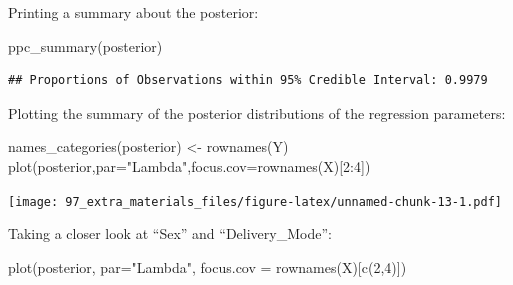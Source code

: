 \documentclass[
]{book}
\newenvironment{Shaded}{\begin{snugshade}}{\end{snugshade}}
\newcommand{\AttributeTok}[1]{\textcolor[rgb]{0.77,0.63,0.00}{#1}}
\newcommand{\CommentTok}[1]{\textcolor[rgb]{0.56,0.35,0.01}{\textit{#1}}}
\newcommand{\DecValTok}[1]{\textcolor[rgb]{0.00,0.00,0.81}{#1}}
\newcommand{\FloatTok}[1]{\textcolor[rgb]{0.00,0.00,0.81}{#1}}
\newcommand{\FunctionTok}[1]{\textcolor[rgb]{0.00,0.00,0.00}{#1}}
\newcommand{\NormalTok}[1]{#1}
\newcommand{\OtherTok}[1]{\textcolor[rgb]{0.56,0.35,0.01}{#1}}
\newcommand{\SpecialCharTok}[1]{\textcolor[rgb]{0.00,0.00,0.00}{#1}}
\newcommand{\StringTok}[1]{\textcolor[rgb]{0.31,0.60,0.02}{#1}}
\begin{document}
\begin{Shaded}
\end{Shaded}

Printing a summary about the posterior:

\begin{Shaded}
\begin{Highlighting}[]
\FunctionTok{ppc\_summary}\NormalTok{(posterior)}
\end{Highlighting}
\end{Shaded}

\begin{verbatim}
## Proportions of Observations within 95% Credible Interval: 0.9979
\end{verbatim}

Plotting the summary of the posterior distributions of the regression parameters:

\begin{Shaded}
\begin{Highlighting}[]
\FunctionTok{names\_categories}\NormalTok{(posterior) }\OtherTok{\textless{}{-}} \FunctionTok{rownames}\NormalTok{(Y)}
\FunctionTok{plot}\NormalTok{(posterior,}\AttributeTok{par=}\StringTok{"Lambda"}\NormalTok{,}\AttributeTok{focus.cov=}\FunctionTok{rownames}\NormalTok{(X)[}\DecValTok{2}\SpecialCharTok{:}\DecValTok{4}\NormalTok{])}
\end{Highlighting}
\end{Shaded}

\texttt{[image: 97\_extra\_materials\_files/figure-latex/unnamed-chunk-13-1.pdf]}

Taking a closer look at ``Sex'' and ``Delivery\_Mode'':

\begin{Shaded}
\begin{Highlighting}[]
\FunctionTok{plot}\NormalTok{(posterior, }\AttributeTok{par=}\StringTok{"Lambda"}\NormalTok{, }\AttributeTok{focus.cov =} \FunctionTok{rownames}\NormalTok{(X)[}\FunctionTok{c}\NormalTok{(}\DecValTok{2}\NormalTok{,}\DecValTok{4}\NormalTok{)])}
\end{Highlighting}
\end{Shaded}
\end{document}
